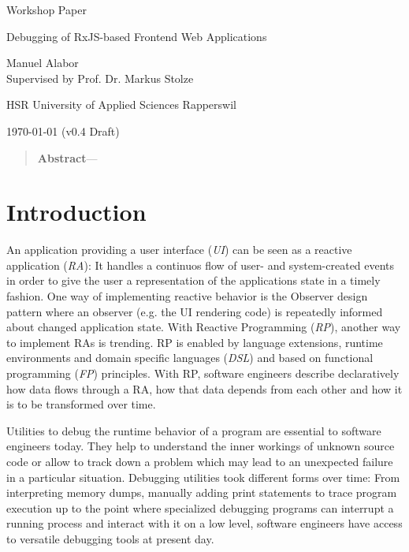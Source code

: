 \documentclass[12pt,a4paper]{article}
\newcommand{\version}{v0.4 Draft}
\begin{document}
\begin{centering}

	\Large{Workshop Paper}
	\par
	\Huge{Debugging of RxJS-based Frontend Web Applications}
	\par
	\vspace{2ex}

	\normalsize{
		Manuel Alabor\\
		Supervised by Prof. Dr. Markus Stolze\\
		\par
		\vspace{2ex}
		HSR University of Applied Sciences Rapperswil\\
		\par
		\vspace{2ex}
		\today{} (\version)
	}
	\par
	\vspace{2ex}

	\begin{quotation}
		\small{
			\noindent\textbf{Abstract}---
		}
		\par
		\vspace{4ex}
	\end{quotation}
\end{centering}

\section{Introduction}

An application providing a user interface (\emph{UI}) can be seen as a reactive application (\emph{RA})\cite{7827078}: It handles a continuos flow of user- and system-created events in order to give the user a representation of the applications state in a timely fashion. One way of implementing reactive behavior is the Observer design pattern\cite{gamma1995design} where an observer (e.g. the UI rendering code) is repeatedly informed about changed application state. With Reactive Programming (\emph{RP}), another way to implement RAs is trending. RP is enabled by language extensions, runtime environments and domain specific languages (\emph{DSL}) and based on functional programming (\emph{FP}) principles. With RP, software engineers describe declaratively how data flows through a RA, how that data depends from each other and how it is to be transformed over time.

Utilities to debug the runtime behavior of a program are essential to software engineers today. They help to understand the inner workings of unknown source code or allow to track down a problem which may lead to an unexpected failure in a particular situation. Debugging utilities took different forms over time: From interpreting memory dumps, manually adding print statements to trace program execution up to the point where specialized debugging programs can interrupt a running process and interact with it on a low level, software engineers have access to versatile debugging tools at present day.
\end{document}
